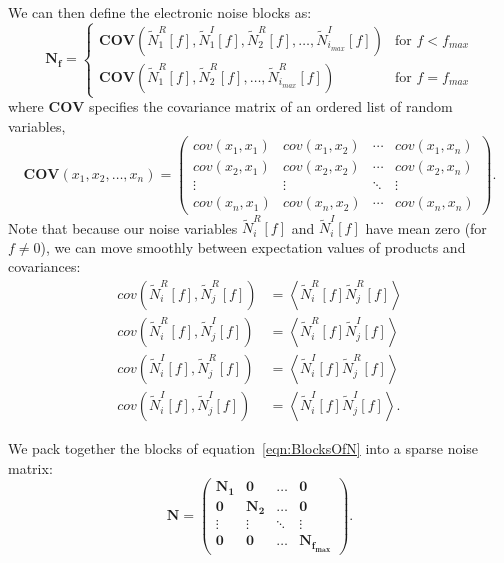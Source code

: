 We can then define the electronic noise blocks as:
\begin{equation} \label{eqn:BlocksOfN}
\mathbf{N_f} = \begin{cases}
  \mathbf{COV}\left(\widetilde{N}_1^R[f], \widetilde{N}_1^I[f], \widetilde{N}_2^R[f], \dots, \widetilde{N}_{i_{max}}^I[f]\right) & \text{for $f < f_{max}$} \\
\mathbf{COV}\left(\widetilde{N}_1^R[f], \widetilde{N}_2^R[f], \dots, \widetilde{N}_{i_{max}}^R[f]\right) & \text{for $f = f_{max}$}
\end{cases}
\end{equation}
where $\mathbf{COV}$ specifies the covariance matrix of an ordered list of random variables,
\begin{equation}\label{eqn:DefnOfCovarianceMatrix}
\mathbf{COV}\left( x_1, x_2, \dots, x_n \right) = \begin{pmatrix}
  cov(x_1, x_1) & cov(x_1, x_2) & \cdots & cov(x_1, x_n) \\
  cov(x_2, x_1) & cov(x_2, x_2) & \cdots & cov(x_2, x_n) \\
  \vdots & \vdots & \ddots & \vdots \\
  cov(x_n, x_1) & cov(x_n, x_2) & \cdots & cov(x_n, x_n)
\end{pmatrix}. \end{equation}
Note that because our noise variables $\widetilde{N}_i^R[f]$ and $\widetilde{N}_i^I[f]$ have mean zero (for $f \ne 0$), we can move smoothly between expectation values of products and covariances:
\begin{subequations} \begin{align}
cov(\widetilde{N}_i^R[f], \widetilde{N}_j^R[f]) &= \left< \widetilde{N}_i^R[f] \widetilde{N}_j^R[f] \right>\\
cov(\widetilde{N}_i^R[f], \widetilde{N}_j^I[f]) &= \left< \widetilde{N}_i^R[f] \widetilde{N}_j^I[f] \right>\\
cov(\widetilde{N}_i^I[f], \widetilde{N}_j^R[f]) &= \left< \widetilde{N}_i^I[f] \widetilde{N}_j^R[f] \right>\\
cov(\widetilde{N}_i^I[f], \widetilde{N}_j^I[f]) &= \left< \widetilde{N}_i^I[f] \widetilde{N}_j^I[f] \right>.
\end{align} \end{subequations}

We pack together the blocks of equation~\ref{eqn:BlocksOfN} into a sparse noise matrix:
\begin{equation} \label{eqn:DefinitionOfN}
\mathbf{N} = \begin{pmatrix}
  \mathbf{N_1} & \mathbf{0} & \dots & \mathbf{0} \\
  \mathbf{0} & \mathbf{N_2} & \dots & \mathbf{0} \\
  \vdots & \vdots & \ddots & \vdots \\
  \mathbf{0} & \mathbf{0} & \dots & \mathbf{N_{f_{max}}}
\end{pmatrix} .\end{equation}

